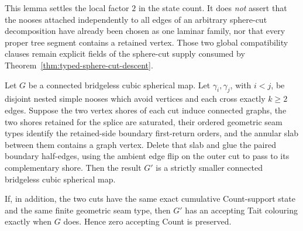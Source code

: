 This lemma settles the local factor \(2\) in the state count.  It does
\emph{not} assert that the nooses attached independently to all edges of an
arbitrary sphere-cut decomposition have already been chosen as one laminar
family, nor that every proper tree segment contains a retained vertex.
Those two global compatibility clauses remain explicit fields of the
sphere-cut supply consumed by Theorem~\ref{thm:typed-sphere-cut-descent}.

\begin{theorem}
\label{thm:physical-noose-deletion}
\Sprose
Let \(G\) be a connected bridgeless cubic spherical map.  Let
\(\gamma_i,\gamma_j\), with \(i<j\), be disjoint nested simple nooses which
avoid vertices and each cross exactly \(k\ge2\) edges.  Suppose the two
vertex shores of each cut induce connected graphs, the two shores retained
for the splice are saturated, their ordered geometric seam types identify
the retained-side boundary first-return orders, and the annular slab between
them contains a graph vertex.  Delete that slab and glue the paired boundary
half-edges, using the ambient edge flip on the outer cut to pass to its
complementary shore.  Then the result \(G'\) is a strictly smaller connected
bridgeless cubic spherical map.

If, in addition, the two cuts have the same exact cumulative Count-support
state and the same finite geometric seam type, then \(G'\) has an accepting
Tait colouring exactly when \(G\) does.  Hence zero accepting Count is
preserved.
\end{theorem}

